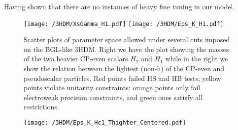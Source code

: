 Having shown that there are no instances of heavy fine tuning in our model. 

\begin{figure}[H]
	\centering
	\texttt{[image: /3HDM/XsGamma\_H1.pdf]}
	\texttt{[image: /3HDM/Eps\_K\_H1.pdf]}
	\caption{Scatter plots of parameter space allowed under  several cuts imposed on the BGL-like 3HDM. Right we have the plot showing the masses of the two heavier CP-even scalars $H_2$ and $H_1$ while in the right we show the relation between the lightest
(non-h) of the CP-even and pseudoscalar particles. Red points failed HS and HB tests; yellow points violate unitarity constraints; orange points only fail electroweak precision constraints, and green ones satisfy all restrictions.}
	\label{fig:PT_plots_H1}
\end{figure}	

\begin{figure}[H]
	\centering
	\texttt{[image: /3HDM/Eps\_K\_Hc1\_Thighter\_Centered.pdf]}
	\caption{}
	\label{fig:STU_3}
\end{figure}	




